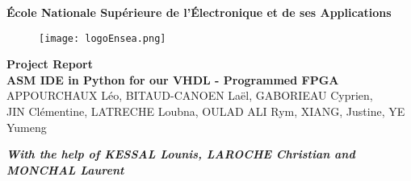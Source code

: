 \documentclass{article}
\begin{document}
\begin{titlepage}
\begin{center}
\textbf{\LARGE École Nationale Supérieure de l'Électronique et de ses Applications}\\[0.5cm]

\vspace{10pt}
\begin{figure}[H]
    \centering
    \texttt{[image: logoEnsea.png]}
        \label{fig:my_label}
\end{figure}

\par

\vspace{15pt}
\textbf{\LARGE  Project Report\\ \textbf{\huge ASM IDE in Python for our VHDL - Programmed FPGA}}\\
\vspace{15pt}
\vspace{25pt}
\large APPOURCHAUX Léo, BITAUD-CANOEN Laël, GABORIEAU Cyprien, \\ JIN Clémentine, LATRECHE Loubna, OULAD ALI Rym, XIANG, Justine, YE Yumeng\\

\vspace{50pt}
\end{center}

\par
\vfill
\begin{center}
\textbf{\vfill \textsl{With the help of KESSAL Lounis, LAROCHE Christian and MONCHAL Laurent}}\\
\end{center}
\end{titlepage}










\newpage
\tableofcontents









\newpage
\end{document}
